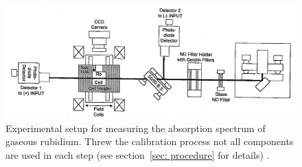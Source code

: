 \begin{figure}
\centering
\includegraphics[width = \textwidth]{pics/setup.png}
\caption{Experimental setup for measuring the absorption spectrum of gaseous rubidium. Threw the calibration 
process not all components are used in each step (see section~\ref{sec: procedure} for details) \cite{anleitung60}. }
\label{fig: setup}
\end{figure}



